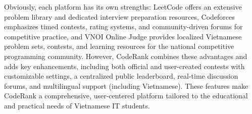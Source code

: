 \FloatBarrier

Obviously, each platform has its own strengths: LeetCode offers an extensive problem library and dedicated interview preparation resources, Codeforces emphasizes timed contests, rating systems, and community-driven forums for competitive practice, and VNOI Online Judge provides localized Vietnamese problem sets, contests, and learning resources for the national competitive programming community. However, CodeRank combines these advantages and adds key enhancements, including both official and user-created contests with customizable settings, a centralized public leaderboard, real-time discussion forums, and multilingual support (including Vietnamese). These features make CodeRank a comprehensive, user-centered platform tailored to the educational and practical needs of Vietnamese IT students.
